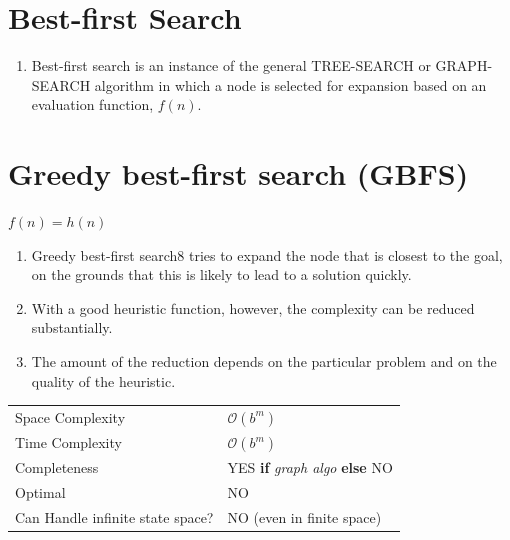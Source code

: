 \section{Best-first Search \cite{aci-1}} \label{Best-first Search}

\begin{enumerate}
    \item Best-first search is an instance of the general TREE-SEARCH or GRAPH-SEARCH algorithm in which a node is selected for expansion based on an evaluation function, $f(n)$.
\end{enumerate}


\section{Greedy best-first search (GBFS) \cite{aci-1}} \label{Greedy best-first search (GBFS)}

\begin{center}
    $f(n) = h(n)$
\end{center}

\begin{enumerate}
    \item Greedy best-first search8 tries to expand the node that is closest to the goal, on the grounds that this is likely to lead to a solution quickly.

    \item With a good heuristic function, however, the complexity can be reduced substantially. 
    
    \item The amount of the reduction depends on the particular problem and on the quality of the heuristic.
\end{enumerate}

\begin{customTableWrapper}{1.2}
\begin{longtable}{p{3cm} p{6cm}}
    Space Complexity & $\mathcal{O}(b^m)$ \\

    Time Complexity & $\mathcal{O}(b^m)$ \\

    \hline

    Completeness & YES \textbf{if} \textit{graph algo} \textbf{else} NO \\

    Optimal & NO \\

    Can Handle infinite state space? & NO (even in finite space) \\
\end{longtable}
\end{customTableWrapper}




